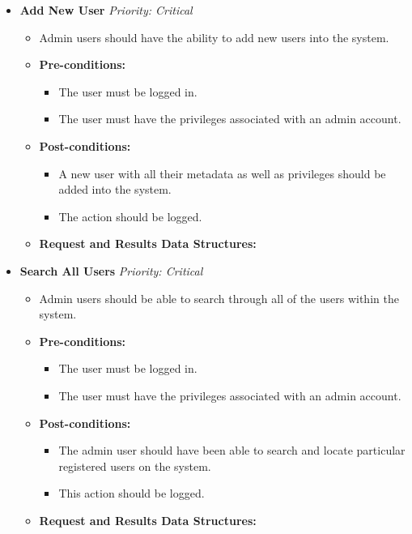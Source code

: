 \documentclass{article}
\begin{document}
				\begin{itemize}
					\item \textbf{Add New User} \hfill \textit{Priority: Critical}
					\begin{itemize}
						\item Admin users should have the ability to add new users into the system.
						\item \textbf{Pre-conditions:}
						\begin{itemize}
							\item The user must be logged in.
							\item The user must have the privileges associated with an admin account.
						\end{itemize}
						\item \textbf{Post-conditions:}
						\begin{itemize}
							\item A new user with all their metadata as well as privileges should be added into the system.
							\item The action should be logged.
						\end{itemize}
						\item \textbf{Request and Results Data Structures:}
					\end{itemize}
					
					\item \textbf{Search All Users} \hfill \textit{Priority: Critical}
					\begin{itemize}
						\item Admin users should be able to search through all of the users within the system.
						\item \textbf{Pre-conditions:}
						\begin{itemize}
							\item The user must be logged in.
							\item The user must have the privileges associated with an admin account.
						\end{itemize}
						\item \textbf{Post-conditions:}
						\begin{itemize}
							\item The admin user should have been able to search and locate particular registered users on the system.
							\item This action should be logged.
						\end{itemize}
						\item \textbf{Request and Results Data Structures:}
					\end{itemize}
					

\end{itemize}
\end{document}
